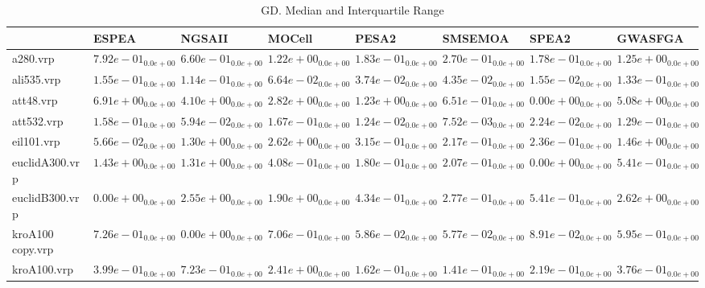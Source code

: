 \documentclass{article}
\begin{document}
\begin{table}
\caption{GD. Median and Interquartile Range}
\label{table: GD}
\centering
\begin{scriptsize}
\begin{tabular}{llllllll}
\hline & ESPEA & NGSAII & MOCell & PESA2 & SMSEMOA & SPEA2 &  GWASFGA\\
\hline 
a280.vrp & $  7.92e-01_{ 0.0e+00}$ & $  6.60e-01_{ 0.0e+00}$ & $  1.22e+00_{ 0.0e+00}$ & \cellcolor{gray25}$  1.83e-01_{ 0.0e+00}$ & $  2.70e-01_{ 0.0e+00}$ & \cellcolor{gray95}$  1.78e-01_{ 0.0e+00}$ & $  1.25e+00_{ 0.0e+00}$ \\
ali535.vrp & $  1.55e-01_{ 0.0e+00}$ & $  1.14e-01_{ 0.0e+00}$ & $  6.64e-02_{ 0.0e+00}$ & \cellcolor{gray25}$  3.74e-02_{ 0.0e+00}$ & $  4.35e-02_{ 0.0e+00}$ & \cellcolor{gray95}$  1.55e-02_{ 0.0e+00}$ & $  1.33e-01_{ 0.0e+00}$ \\
att48.vrp & $  6.91e+00_{ 0.0e+00}$ & $  4.10e+00_{ 0.0e+00}$ & $  2.82e+00_{ 0.0e+00}$ & $  1.23e+00_{ 0.0e+00}$ & \cellcolor{gray25}$  6.51e-01_{ 0.0e+00}$ & \cellcolor{gray95}$  0.00e+00_{ 0.0e+00}$ & $  5.08e+00_{ 0.0e+00}$ \\
att532.vrp & $  1.58e-01_{ 0.0e+00}$ & $  5.94e-02_{ 0.0e+00}$ & $  1.67e-01_{ 0.0e+00}$ & \cellcolor{gray25}$  1.24e-02_{ 0.0e+00}$ & \cellcolor{gray95}$  7.52e-03_{ 0.0e+00}$ & $  2.24e-02_{ 0.0e+00}$ & $  1.29e-01_{ 0.0e+00}$ \\
eil101.vrp & \cellcolor{gray95}$  5.66e-02_{ 0.0e+00}$ & $  1.30e+00_{ 0.0e+00}$ & $  2.62e+00_{ 0.0e+00}$ & $  3.15e-01_{ 0.0e+00}$ & \cellcolor{gray25}$  2.17e-01_{ 0.0e+00}$ & $  2.36e-01_{ 0.0e+00}$ & $  1.46e+00_{ 0.0e+00}$ \\
euclidA300.vrp & $  1.43e+00_{ 0.0e+00}$ & $  1.31e+00_{ 0.0e+00}$ & $  4.08e-01_{ 0.0e+00}$ & \cellcolor{gray25}$  1.80e-01_{ 0.0e+00}$ & $  2.07e-01_{ 0.0e+00}$ & \cellcolor{gray95}$  0.00e+00_{ 0.0e+00}$ & $  5.41e-01_{ 0.0e+00}$ \\
euclidB300.vrp & \cellcolor{gray95}$  0.00e+00_{ 0.0e+00}$ & $  2.55e+00_{ 0.0e+00}$ & $  1.90e+00_{ 0.0e+00}$ & $  4.34e-01_{ 0.0e+00}$ & \cellcolor{gray25}$  2.77e-01_{ 0.0e+00}$ & $  5.41e-01_{ 0.0e+00}$ & $  2.62e+00_{ 0.0e+00}$ \\
kroA100 copy.vrp & $  7.26e-01_{ 0.0e+00}$ & \cellcolor{gray95}$  0.00e+00_{ 0.0e+00}$ & $  7.06e-01_{ 0.0e+00}$ & $  5.86e-02_{ 0.0e+00}$ & \cellcolor{gray25}$  5.77e-02_{ 0.0e+00}$ & $  8.91e-02_{ 0.0e+00}$ & $  5.95e-01_{ 0.0e+00}$ \\
kroA100.vrp & $  3.99e-01_{ 0.0e+00}$ & $  7.23e-01_{ 0.0e+00}$ & $  2.41e+00_{ 0.0e+00}$ & \cellcolor{gray25}$  1.62e-01_{ 0.0e+00}$ & \cellcolor{gray95}$  1.41e-01_{ 0.0e+00}$ & $  2.19e-01_{ 0.0e+00}$ & $  3.76e-01_{ 0.0e+00}$ \\

\end{tabular}
\end{scriptsize}
\end{table}
\end{document}
